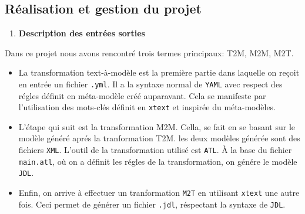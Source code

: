 
\hypertarget{ruxe9alisation-et-gestion-du-projet}{%
\subsection{Réalisation et gestion du
projet}\label{ruxe9alisation-et-gestion-du-projet}}

\begin{enumerate}
\def\labelenumi{\arabic{enumi}.}
\item
  \textbf{Description des entrées sorties}
\end{enumerate}

Dans ce projet nous avons rencontré trois termes principaux: T2M, M2M,
M2T.

\begin{itemize}
\item
  La transformation text-à-modèle est la première partie dans laquelle
  on reçoit en entrée un fichier \texttt{.yml}. Il a la syntaxe normal
  de \texttt{YAML} avec respect des régles définit en méta-modèle créé
  auparavant. Cela se manifeste par l'utilisation des mots-clés définit
  en \texttt{xtext} et inspirée du méta-modèles.\\
  \begin{figure}[H]
    \begin{center}
        \caption{}
    \end{center}
\end{figure}
\item
  L'étape qui suit est la transformation M2M. Cella, se fait en se
  basant sur le modèle généré aprés la tranformation T2M. les deux
  modèles générée sont des fichiers \texttt{XML}. L'outil de la
  transformation utilisé est \texttt{ATL}. À la base du fichier
  \texttt{main.atl}, où on a définit les régles de la transformation, on
  génére le modèle \texttt{JDL}.\\
  \begin{figure}[H]
    \begin{center}
        \caption{}
    \end{center}
\end{figure}
\item
  Enfin, on arrive à effectuer un tranformation \texttt{M2T} en
  utilisant \texttt{xtext} une autre fois. Ceci permet de générer un
  fichier \texttt{.jdl}, réspectant la syntaxe de \texttt{JDL}.\\
  \begin{figure}[H]
    \begin{center}
        \caption{}
    \end{center}
\end{figure}
\end{itemize}

